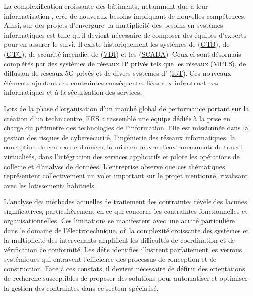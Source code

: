 \documentclass[a4paper,12pt]{article}
\begin{document}
La complexification croissante des bâtiments, notamment due à leur informatisation \autocite{DecretNdeg20208872020,SmartReadinessIndicatora}, crée de nouveaux besoins impliquant de nouvelles compétences. Ainsi, sur des projets d’envergure, la multiplicité des besoins en systèmes informatiques est telle qu’il devient nécessaire de composer des équipes d'experts pour en assurer le suivi. Il existe historiquement les systèmes de  (\protect\hyperlink{gls-11}{\label{gls-11-use-1}GTB}), de  (\protect\hyperlink{gls-12}{\label{gls-12-use-1}GTC}), de sécurité incendie, de  (\protect\hyperlink{gls-13}{\label{gls-13-use-1}VDI}) et les  (\protect\hyperlink{gls-14}{\label{gls-14-use-1}SCADA}). Ceux-ci sont désormais complétés par des systèmes de réseaux IP privés tels que les réseaux  (\protect\hyperlink{gls-15}{\label{gls-15-use-1}MPLS}), de diffusion de réseaux 5G privés et de divers systèmes d’ (\protect\hyperlink{gls-16}{\label{gls-16-use-1}IoT}). Ces nouveaux éléments ajoutent des contraintes conséquentes liées aux infrastructures informatiques et à la sécurisation des services.

Lors de la phase d’organisation d’un marché global de performance portant sur la création d’un technicentre, EES a rassemblé une équipe dédiée à la prise en charge du périmètre des technologies de l’information. Elle est missionnée dans la gestion des risques de cybersécurité, l'ingénierie des réseaux informatiques, la conception de centres de données, la mise en œuvre d’environnements de travail virtualisés, dans l’intégration des services applicatifs et pilote les opérations de collecte et d’analyse de données. L’entreprise observe que ces thématiques représentent collectivement un volet important sur le projet mentionné, rivalisant avec les lotissements habituels. 

L'analyse des méthodes actuelles de traitement des contraintes révèle des lacunes significatives, particulièrement en ce qui concerne les contraintes fonctionnelles et organisationnelles. Ces limitations se manifestent avec une acuité particulière dans le domaine de l'électrotechnique, où la complexité croissante des systèmes et la multiplicité des intervenants amplifient les difficultés de coordination et de vérification de conformité. Les défis identifiés illustrent parfaitement les verrous systémiques qui entravent l'efficience des processus de conception et de construction. Face à ces constats, il devient nécessaire de définir des orientations de recherche susceptibles de proposer des solutions pour automatiser et optimiser la gestion des contraintes dans ce secteur spécialisé.
\end{document}
